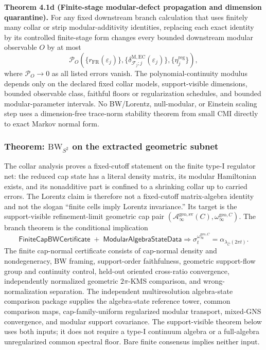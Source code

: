 \textbf{Theorem 4.1d (Finite-stage modular-defect propagation and dimension quarantine).}
For any fixed downstream branch calculation that uses finitely many collar or strip
modular-additivity identities, replacing each exact identity by its controlled finite-stage form
changes every bounded downstream modular observable \(O\) by at most
\[
\mathcal P_O\!\left(
\{r_{\mathrm{FR}}(\varepsilon_j)\},
\{\delta^{\mathrm{M,EC}}_{\mathcal F_j;j}(\varepsilon_j)\},
\{\eta^{\mathrm{reg}}_j\}
\right),
\]
where \(\mathcal P_O\to0\) as all listed errors vanish. The polynomial-continuity modulus depends
only on the declared fixed collar models, support-visible dimensions, bounded observable class,
faithful floors or regularization schedules, and bounded modular-parameter intervals. No BW/Lorentz,
null-modular, or Einstein scaling step uses a dimension-free trace-norm stability theorem from
small CMI directly to exact Markov normal form.
\subsubsection{\texorpdfstring{Theorem: \(\mathrm{BW}_{S^2}\) on the extracted geometric subnet}{4.2 Theorem: \textbackslash mathrm\{BW\}\_\{S\^{}2\} on the extracted geometric subnet}}\label{42-theorem-mathrmbw_s2-from-markov-locality-symmetry-regularity}

The collar analysis proves a fixed-cutoff statement on the finite type-I regulator net: the reduced cap state has a literal density matrix, its modular Hamiltonian exists, and its nonadditive part is confined to a shrinking collar up to carried errors. The Lorentz claim is therefore not a fixed-cutoff matrix-algebra identity and not the slogan ``finite cells imply Lorentz invariance.'' Its target is the support-visible refinement-limit geometric cap pair \((\mathcal A_\infty^{\mathrm{geo,sv}}(C),\omega_\infty^{\mathrm{geo},C})\). The branch theorem is the conditional implication
\[
\mathsf{FiniteCapBWCertificate}
\; + \; \mathsf{ModularAlgebraStateData}
\Longrightarrow
\sigma_t^{\omega_\infty^{\mathrm{geo},C}}
=
\alpha_{\lambda_{\widehat C}(2\pi t)}.
\]
The finite cap-normal certificate consists of cap-normal density and nondegeneracy, BW framing,
support-order faithfulness, geometric support-flow group and continuity control, held-out oriented
cross-ratio convergence, independently normalized geometric \(2\pi\)-KMS comparison, and
wrong-normalization separation. The independent multiresolution algebra-state comparison package supplies the
algebra-state reference tower, common comparison maps, cap-family-uniform regularized modular
transport, mixed-GNS convergence, and modular support covariance. The support-visible theorem below
uses both inputs; it does not require a type-I continuum algebra or a full-algebra unregularized
common spectral floor. Bare finite consensus implies neither input.

